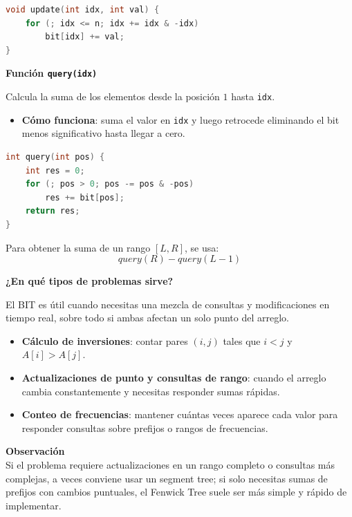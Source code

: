 \begin{lstlisting}[language=C++]
void update(int idx, int val) {
    for (; idx <= n; idx += idx & -idx)
        bit[idx] += val;
}
\end{lstlisting}

\textbf{Función \texttt{query(idx)}}

Calcula la suma de los elementos desde la posición $1$ hasta \texttt{idx}.

\begin{itemize}
    \item \textbf{Cómo funciona}: suma el valor en \texttt{idx} y luego retrocede eliminando el bit menos significativo hasta llegar a cero.
\end{itemize}

\begin{lstlisting}[language=C++]
int query(int pos) {
    int res = 0;
    for (; pos > 0; pos -= pos & -pos)
        res += bit[pos];
    return res;
}
\end{lstlisting}

Para obtener la suma de un rango $[L, R]$, se usa:
\[
query(R) - query(L - 1)
\]

\textbf{¿En qué tipos de problemas sirve?}

El BIT es útil cuando necesitas una mezcla de consultas y modificaciones en tiempo real, sobre todo si ambas afectan un solo punto del arreglo.

\begin{itemize}
    \item \textbf{Cálculo de inversiones}: contar pares $(i, j)$ tales que $i < j$ y $A[i] > A[j]$.
    \item \textbf{Actualizaciones de punto y consultas de rango}: cuando el arreglo cambia constantemente y necesitas responder sumas rápidas.
    \item \textbf{Conteo de frecuencias}: mantener cuántas veces aparece cada valor para responder consultas sobre prefijos o rangos de frecuencias.
\end{itemize}

\textbf{Observación} \\
Si el problema requiere actualizaciones en un rango completo o consultas más complejas, a veces conviene usar un segment tree; si solo necesitas sumas de prefijos con cambios puntuales, el Fenwick Tree suele ser más simple y rápido de implementar.


